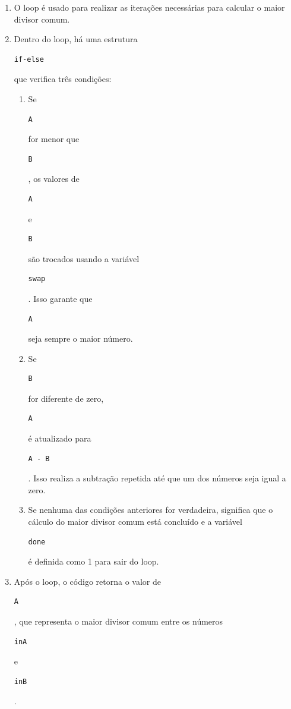 \documentclass[a4paper,11pt]{article} %
\begin{document}
\begin{enumerate}
    \item O loop é usado para realizar as iterações necessárias para calcular o maior divisor comum.
    \item Dentro do loop, há uma estrutura \begin{verbatim}if-else\end{verbatim} que verifica três condições:
          \begin{enumerate}
              \item Se \begin{verbatim}A\end{verbatim} for menor que \begin{verbatim}B\end{verbatim}, os valores de \begin{verbatim}A\end{verbatim} e \begin{verbatim}B\end{verbatim} são trocados usando a variável \begin{verbatim}swap\end{verbatim}. Isso garante que \begin{verbatim}A\end{verbatim} seja sempre o maior número.
              \item Se \begin{verbatim}B\end{verbatim} for diferente de zero, \begin{verbatim}A\end{verbatim} é atualizado para \begin{verbatim}A - B\end{verbatim}. Isso realiza a subtração repetida até que um dos números seja igual a zero.
              \item Se nenhuma das condições anteriores for verdadeira, significa que o cálculo do maior divisor comum está concluído e a variável \begin{verbatim}done\end{verbatim} é definida como 1 para sair do loop.
          \end{enumerate}
    \item Após o loop, o código retorna o valor de \begin{verbatim}A\end{verbatim}, que representa o maior divisor comum entre os números \begin{verbatim}inA\end{verbatim} e \begin{verbatim}inB\end{verbatim}.
\end{enumerate}
\end{document}
